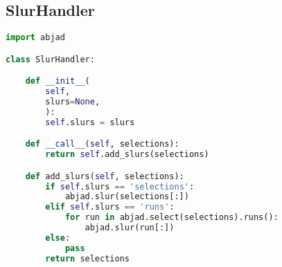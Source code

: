 \subsection{SlurHandler}
\singlespace
\begin{lstlisting}[language=Python, caption=SlurHandler]
import abjad

class SlurHandler:

    def __init__(
        self,
        slurs=None,
        ):
        self.slurs = slurs

    def __call__(self, selections):
        return self.add_slurs(selections)

    def add_slurs(self, selections):
        if self.slurs == 'selections':
            abjad.slur(selections[:])
        elif self.slurs == 'runs':
            for run in abjad.select(selections).runs():
                abjad.slur(run[:])
        else:
            pass
        return selections
\end{lstlisting}
\doublespace

